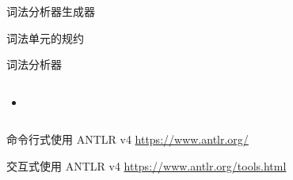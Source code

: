 
\begin{frame}{}
  \begin{center}
    词法分析器生成器
  \end{center}
\end{frame}

\begin{frame}{}
  \begin{center}
     词法单元的规约

    \vspace{0.50cm}
    \texttt{}

    \vspace{1.00cm}
     词法分析器

    \begin{columns}
        \begin{itemize}
          \setlength{\itemsep}{8pt}
          \item \texttt{}
        \end{itemize}
    \end{columns}


  \end{center}
\end{frame}

\begin{frame}{}
\end{frame}

\begin{frame}{}
  \begin{center}
    命令行式使用 ANTLR v4
    \url{https://www.antlr.org/}
  \end{center}
\end{frame}

\begin{frame}{}
  \begin{center}
    交互式使用 ANTLR v4
    \url{https://www.antlr.org/tools.html}
  \end{center}
\end{frame}

